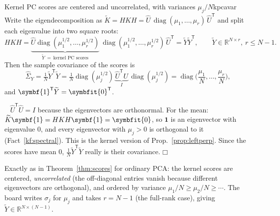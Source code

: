 \documentclass[11pt]{article}
\newcommand{\bm}[1]{\symbfit{#1}}
\newenvironment{proofsketch}{\par\noindent{\itshape Proof.}\ }{\hfill$\mdlgwhtsquare$\par}
\newcommand{\R}{\mathbb{R}}
\newcommand{\one}{\symbf{1}}
\newcommand{\Sig}{\widehat{\Sigma}}
\newcommand{\T}{^{\mathsf T}}
\newcommand{\diag}{\operatorname{diag}}
\begin{document}
\begin{proposition}{Kernel PC scores are centered and uncorrelated, with variances $\mu_j/N$}{kpcavar}
Write the eigendecomposition as $\widetilde K=HKH=\widehat U\,\diag(\mu_1,\dots,\mu_r)\,\widehat U\T$ and split each eigenvalue into two square roots:
\[
HKH=\underbrace{\widehat U\diag(\mu_1^{1/2},\dots,\mu_r^{1/2})}_{\widetilde Y\ =\ \text{kernel PC scores}}\ \diag(\mu_1^{1/2},\dots,\mu_r^{1/2})\,\widehat U\T=\widetilde Y\widetilde Y\T,
\qquad \widetilde Y\in\R^{N\times r},\ r\le N-1 .
\]
Then the sample covariance of the scores is
\[
\Sig_Y=\tfrac1N\widetilde Y\T\widetilde Y=\tfrac1N\diag(\mu_j^{1/2})\,\underbrace{\widehat U\T\widehat U}_{I}\,\diag(\mu_j^{1/2})=\diag\Big(\frac{\mu_1}N,\dots,\frac{\mu_r}N\Big),
\]
and $\one\T\widetilde Y=\bm0\T$.
\end{proposition}
\begin{proofsketch}
$\widehat U\T\widehat U=I$ because the eigenvectors are orthonormal. For the mean: $\widetilde K\one=HKH\one=\bm0$, so $\one$ is an eigenvector
with eigenvalue $0$, and every eigenvector with $\mu_j>0$ is orthogonal to it (Fact~\ref{kf:spectral}). This is the kernel version of
Prop.~\ref{prop:leftperp}. Since the scores have mean $0$, $\tfrac1N\widetilde Y\T\widetilde Y$ really is their covariance.
\end{proofsketch}

\begin{intuition}
Exactly as in Theorem~\ref{thm:scores} for ordinary PCA: the kernel scores are centered, \emph{uncorrelated} (the off-diagonal
entries vanish because different eigenvectors are orthogonal), and ordered by variance $\mu_1/N\ge\mu_2/N\ge\cdots$. The board writes
$\sigma_j$ for $\mu_j$ and takes $r=N-1$ (the full-rank case), giving $\widetilde Y\in\R^{N\times(N-1)}$.
\end{intuition}
\end{document}
